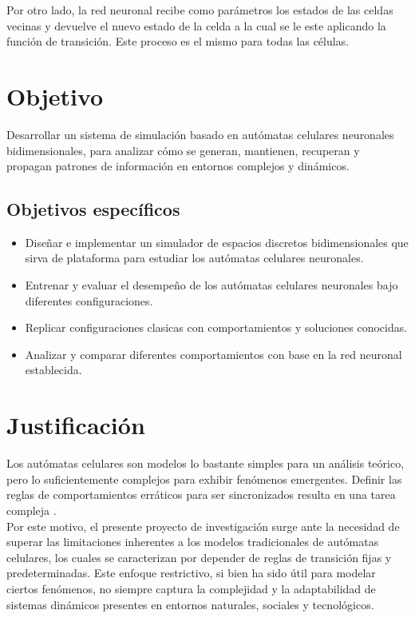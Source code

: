 \documentclass[letterpaper,10pt,oneside]{article}
\begin{document}
	Por otro lado, la red neuronal recibe como parámetros los estados de las celdas vecinas y devuelve el nuevo estado de la celda a la cual se le este aplicando la función de transición. Este proceso es el mismo para todas las células.
	
	\section{Objetivo}
	
	Desarrollar un sistema de simulación basado en autómatas celulares neuronales bidimensionales, para analizar cómo se generan, mantienen, recuperan y propagan patrones de información en entornos complejos y dinámicos.
	
	\subsection{Objetivos específicos}
	
	\begin{itemize}
		\item Diseñar e implementar un simulador de espacios discretos bidimensionales que sirva de plataforma para estudiar los autómatas celulares neuronales.
		\item Entrenar y evaluar el desempeño de los autómatas celulares neuronales bajo diferentes configuraciones.
		\item Replicar configuraciones clasicas con comportamientos y soluciones conocidas. 
		\item Analizar y comparar diferentes comportamientos con base en la red neuronal establecida.
	\end{itemize}
	
	\section{Justificación}
	
	Los autómatas celulares son modelos lo bastante simples para un análisis teórico, pero lo suficientemente complejos para exhibir fenómenos emergentes. Definir las reglas de comportamientos erráticos para ser sincronizados resulta en una tarea compleja \cite{computationalBiology2016}. \\
	
	Por este motivo, el presente proyecto de investigación surge ante la necesidad de superar las limitaciones inherentes a los modelos tradicionales de autómatas celulares, los cuales se caracterizan por depender de reglas de transición fijas y predeterminadas. Este enfoque restrictivo, si bien ha sido útil para modelar ciertos fenómenos, no siempre captura la complejidad y la adaptabilidad de sistemas dinámicos presentes en entornos naturales, sociales y tecnológicos. \\
	
\end{document}
